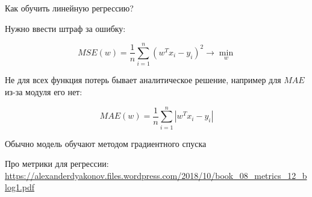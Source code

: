 \documentclass[notes,12pt, aspectratio=169]{beamer}
\newenvironment{wideitemize}{\itemize\addtolength{\itemsep}{10pt}}{\enditemize}
\begin{document}
\begin{frame}{Как обучить линейную регрессию?}
\begin{wideitemize}

\item Нужно ввести штраф за ошибку:

\[
MSE(w) = \frac{1}{n} \sum_{i=1}^n (w^T x_i - y_i)^2   \to \min_{w}
\]

\item Не для всех функция потерь бывает аналитическое решение, например для $MAE$ из-за модуля его нет:

\[
MAE(w) = \frac{1}{n} \sum_{i=1}^n |w^Tx_i - y_i|
\]

\item \alert{Обычно модель обучают методом градиентного спуска}
\end{wideitemize}

\vfill
\scriptsize Про метрики для регрессии: \\
\color{blue} \url{https://alexanderdyakonov.files.wordpress.com/2018/10/book_08_metrics_12_blog1.pdf}
\end{frame}
\end{document}
